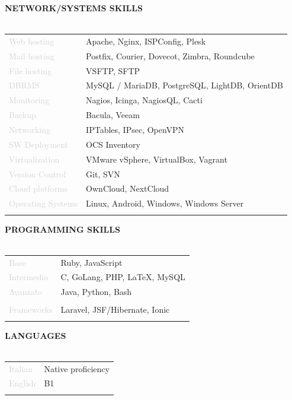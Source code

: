 \documentclass{article}
\begin{document}
\textbf{\textcolor{deepblue}{NETWORK/SYSTEMS SKILLS}} \\\\ \hfill
\begin{tabular}{ R{4cm} l }
	\textcolor{lightgray}{Web hosting}       & Apache, Nginx, ISPConfig, Plesk                \\ \hfill
	\textcolor{lightgray}{Mail hosting}      & Postfix, Courier, Dovecot, Zimbra, Roundcube   \\ \hfill
	\textcolor{lightgray}{File hosting}      & VSFTP, SFTP                                    \\ \hfill
	\textcolor{lightgray}{DBRMS}             & MySQL / MariaDB, PostgreSQL, LightDB, OrientDB \\ \hfill
	\textcolor{lightgray}{Monitoring}        & Nagios, Icinga, NagiosQL, Cacti                \\ \hfill
	\textcolor{lightgray}{Backup}            & Bacula, Veeam                                  \\ \hfill
	\textcolor{lightgray}{Networking}        & IPTables, IPsec, OpenVPN                       \\ \hfill
	\textcolor{lightgray}{SW Deployment}     & OCS Inventory                                  \\ \hfill
	\textcolor{lightgray}{Virtualization}    & VMware vSphere, VirtualBox, Vagrant            \\ \hfill
	\textcolor{lightgray}{Version Control}   & Git, SVN                                       \\ \hfill
	\textcolor{lightgray}{Cloud platforms}   & OwnCloud, NextCloud                            \\ \hfill
	\textcolor{lightgray}{Operating Systems} & Linux, Android, Windows, Windows Server        \\ \hfill
\end{tabular}

\textbf{\textcolor{deepblue}{PROGRAMMING SKILLS}} \\\\ \hfill
\begin{tabular}{ R{4cm} l }
	\textcolor{lightgray}{Base}       & Ruby, JavaScript              \\ \hfill
	\textcolor{lightgray}{Intermedio} & C, GoLang, PHP, LaTeX, MySQL  \\ \hfill
	\textcolor{lightgray}{Avanzato}   & Java, Python, Bash            \\\\ \hfill
	\textcolor{lightgray}{Frameworks} & Laravel, JSF/Hibernate, Ionic \\ \hfill
\end{tabular}

\textbf{\textcolor{deepblue}{LANGUAGES}} \\\\ \hfill
\begin{tabular}{ R{4cm} l }
	\textcolor{lightgray}{Italian} & Native proficiency \\ \hfill
	\textcolor{lightgray}{English} & B1                 \\ \hfill
\end{tabular}
\end{document}
